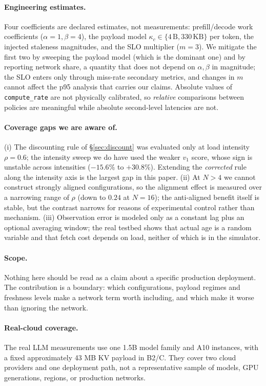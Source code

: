 \paragraph{Engineering estimates.} Four coefficients are declared estimates, not measurements:
prefill/decode work coefficients ($\alpha=1,\beta=4$), the payload model
$\kappa_c\in\{4\,\text{B},330\,\text{KB}\}$ per token, the injected staleness magnitudes, and the
SLO multiplier ($m=3$). We mitigate the first two by sweeping the payload model (which is the
dominant one) and by reporting network share, a quantity that does not depend on $\alpha,\beta$
in magnitude; the SLO enters only through miss-rate secondary metrics, and changes in $m$ cannot
affect the p95 analysis that carries our claims. Absolute values of \texttt{compute\_rate} are
not physically calibrated, so \emph{relative} comparisons between policies are meaningful while
absolute second-level latencies are not.

\paragraph{Coverage gaps we are aware of.} (i) The discounting rule of \S\ref{sec:discount} was
evaluated only at load intensity $\rho=0.6$; the intensity sweep we do have used the weaker $v_1$
score, whose sign is unstable across intensities ($-15.6\%$ to $+30.8\%$). Extending the
\emph{corrected} rule along the intensity axis is the largest gap in this paper.
(ii) At $N>4$ we cannot construct strongly aligned configurations, so the alignment effect is
measured over a narrowing range of $\rho$ (down to $0.24$ at $N=16$); the anti-aligned benefit
itself is stable, but the contrast narrows for reasons of experimental control rather than
mechanism. (iii) Observation error is modeled only as a constant lag plus an optional averaging
window; the real testbed shows that actual age is a random variable and that fetch cost depends
on load, neither of which is in the simulator.

\paragraph{Scope.} Nothing here should be read as a claim about a specific production
deployment. The contribution is a boundary: which configurations, payload regimes and freshness
levels make a network term worth including, and which make it worse than ignoring the network.

\paragraph{Real-cloud coverage.} The real LLM measurements use one 1.5B model family and A10
instances, with a fixed approximately 43 MB KV payload in B2/C. They cover two
cloud providers and one deployment path, not a representative sample of models, GPU generations,
regions, or production networks.

